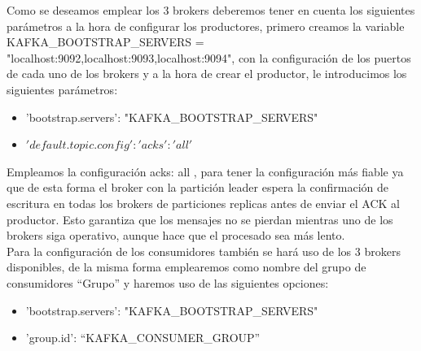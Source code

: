 \documentclass[12pt, a4paper, twoside]{article}
\newcommand{\quotes}[1]{``#1''}
\begin{document}
Como se deseamos emplear los 3 brokers deberemos tener en cuenta los siguientes parámetros a la hora de configurar los productores, primero creamos la variable\\ KAFKA\_BOOTSTRAP\_SERVERS = "localhost:9092,localhost:9093,localhost:9094", con la configuración de los puertos de cada uno de los brokers y a la hora de crear el productor, le introducimos los siguientes parámetros:
\begin{itemize}
\item 'bootstrap.servers': "KAFKA\_BOOTSTRAP\_SERVERS"
\item $'default.topic.config': {'acks': 'all'}$
\end{itemize}
\newpage
 Empleamos la configuración acks: all , para tener la configuración más fiable ya que de esta forma el broker con la  partición leader espera la confirmación de escritura en todas los brokers de particiones replicas antes de enviar el ACK al productor. Esto garantiza que los mensajes no se pierdan mientras uno de los brokers siga operativo, aunque hace que el procesado sea más lento.\\

Para la configuración de los consumidores también se hará uso de los 3 brokers disponibles, de la misma forma emplearemos como nombre del grupo de consumidores \quotes{Grupo} y haremos uso de las siguientes opciones:
\begin{itemize}
\item 'bootstrap.servers': "KAFKA\_BOOTSTRAP\_SERVERS"
\item 'group.id': \quotes{KAFKA\_CONSUMER\_GROUP}
\end{itemize}
\end{document}

